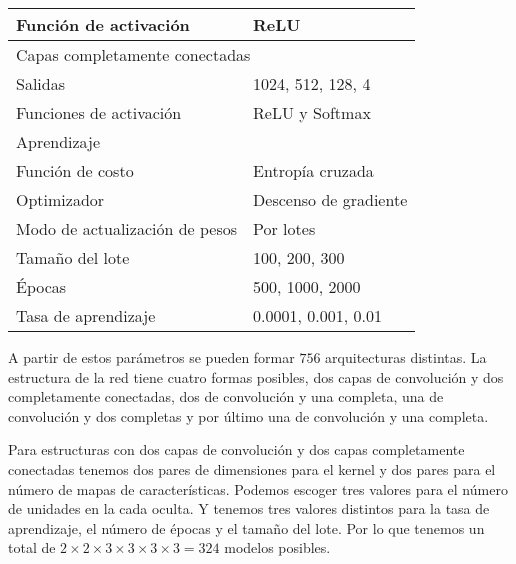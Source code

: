 \begin{table}[]
\begin{tabular}{|l|l|}
Función de activación    & ReLU                                                                                                                                        \\ \hline
\multicolumn{2}{|l|}{Capas completamente conectadas}                                                                                                                   \\ \hline
Salidas                  & 1024, 512, 128, 4                                                                                                                               \\ \hline
Funciones de activación  & ReLU y Softmax                                                                                                                              \\ \hline
\multicolumn{2}{|l|}{Aprendizaje}                                                                                                                                      \\ \hline
Función de costo         & Entropía cruzada                                                                                                                            \\ \hline
Optimizador              & Descenso de gradiente                                                                                                                       \\ \hline
Modo de actualización de pesos & Por lotes
\\ \hline
Tamaño del lote & 100, 200, 300
\\ \hline
Épocas & 500, 1000, 2000
\\ \hline
Tasa de aprendizaje & 0.0001, 0.001, 0.01
\\ \hline
\end{tabular}

\end{table}

A partir de estos parámetros se pueden formar $756$ arquitecturas distintas. 
La estructura de la red tiene cuatro formas posibles, dos capas de convolución
y dos completamente conectadas, dos de convolución y una completa, una de convolución
y dos completas y por último una de convolución y una completa. 

Para estructuras con dos capas de convolución y dos capas completamente conectadas 
tenemos dos
pares de dimensiones para el kernel y dos pares para el número de mapas de 
características. Podemos escoger tres valores para el número de unidades 
en la cada oculta. Y tenemos tres valores distintos para la tasa de aprendizaje, 
el número de épocas y el tamaño del lote. Por lo que tenemos un total
de $2 \times 2 \times 3 \times 3 \times 3 \times 3 = 324$ modelos posibles. 

